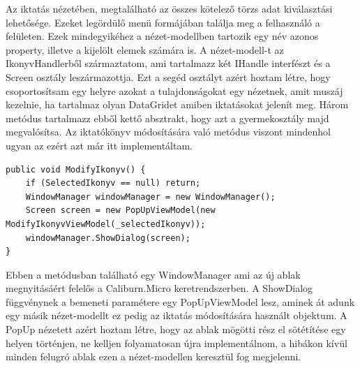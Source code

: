 \documentclass[
]{thesis-ekf}
\theoremstyle{definition}
\theoremstyle{remark}
\begin{document}
Az iktatás nézetében, megtalálható az összes kötelező törzs adat kiválasztási lehetősége. Ezeket legördülő menü formájában találja meg a felhasználó a felületen. Ezek mindegyikéhez a nézet-modellben tartozik egy név azonos property, illetve a kijelölt elemek számára is. A nézet-modell-t az IkonyvHandlerből származtatom, ami tartalmazz két IHandle interfészt és a Screen osztály leszármazottja. Ezt a segéd osztályt azért hoztam létre, hogy csoportosítsam egy helyre azokat a tulajdonságokat egy nézetnek, amit muszáj kezelnie, ha tartalmaz olyan DataGridet amiben iktatásokat jelenít meg. Három metódus tartalmazz ebből kettő absztrakt, hogy azt a gyermekosztály majd megvalósítsa. Az iktatókönyv módosítására való metódus viszont mindenhol ugyan az ezért azt már itt implementáltam. 
\begin{lstlisting}[caption={Iktatás módosítása ablak megnyítása WindowManager segítségével.},captionpos=b]
public void ModifyIkonyv() {
	if (SelectedIkonyv == null) return;
	WindowManager windowManager = new WindowManager();
	Screen screen = new PopUpViewModel(new ModifyIkonyvViewModel(_selectedIkonyv));
	windowManager.ShowDialog(screen);	
}
\end{lstlisting}
Ebben a metódusban található egy WindowManager ami az új ablak megnyitásáért felelős a Caliburn.Micro keretrendszerben. A ShowDialog függvénynek a bemeneti paramétere egy PopUpViewModel lesz, aminek át adunk egy másik nézet-modellt ez pedig az iktatás módosítására használt objektum. A PopUp nézetett azért hoztam létre, hogy az ablak mögötti rész el sötétítése egy helyen történjen, ne kelljen folyamatosan újra implementálnom, a hibákon kívül minden felugró ablak ezen a nézet-modellen keresztül fog megjelenni. 
\end{document}
